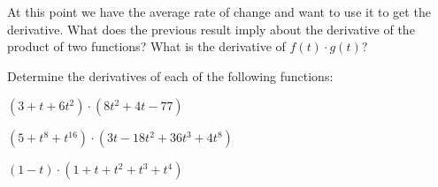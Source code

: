 \begin{problem}
\begin{subproblem}
      \vfill

  \end{subproblem}

  \clearpage

\item At this point we have the average rate of change and want to use
  it to get the derivative. What does the previous result imply about
  the derivative of the product of two functions? What is the
  derivative of $f(t)\cdot g(t)$?

  \vfill

\item Determine the derivatives of each of the following functions:
  \begin{subproblem}
  \item $(3+t+6t^2) \cdot (8t^2+4t-77)$
    \vfill
  \item $(5+t^8+t^{16}) \cdot (3t-18t^2+36t^3+4t^8)$
    \vfill
  \item $(1-t) \cdot (1+t+t^2+t^3+t^4)$
    \vfill
  \end{subproblem}


\end{problem}

\postClass

